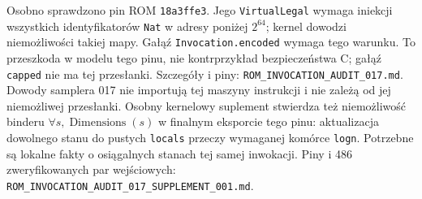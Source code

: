 \documentclass[11pt,a4paper]{article}
\newcommand{\code}[1]{\nolinkurl{#1}}
\begin{document}
Osobno sprawdzono pin ROM \code{18a3ffe3}. Jego \code{VirtualLegal}
wymaga iniekcji wszystkich identyfikatorów \code{Nat} w adresy poniżej
$2^{64}$; kernel dowodzi niemożliwości takiej mapy. Gałąź
\code{Invocation.encoded} wymaga tego warunku. To przeszkoda w modelu
tego pinu, nie kontrprzykład bezpieczeństwa C; gałąź \code{capped} nie
ma tej przesłanki. Szczegóły i piny: \code{ROM_INVOCATION_AUDIT_017.md}.
Dowody samplera 017 nie importują tej maszyny instrukcji i nie zależą od
jej niemożliwej przesłanki.
Osobny kernelowy suplement stwierdza też niemożliwość binderu
$\forall s,\operatorname{Dimensions}(s)$ w finalnym eksporcie
tego pinu: aktualizacja dowolnego stanu do pustych \code{locals}
przeczy wymaganej komórce \code{logn}. Potrzebne są lokalne fakty
o osiągalnych stanach tej samej inwokacji. Piny i 486 zweryfikowanych par
wejściowych: \code{ROM_INVOCATION_AUDIT_017_SUPPLEMENT_001.md}.
\end{document}
